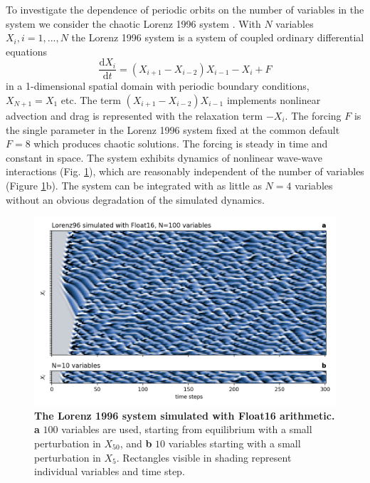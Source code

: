 To investigate the dependence of periodic orbits on the number of variables in the system we consider the chaotic Lorenz 1996 system
\citep{Hatfield2017, Lorenz1998}. With $N$ variables $X_i,i=1,...,N$ the Lorenz 1996 system is a system of coupled ordinary differential
equations
\begin{equation}
	\frac{\mathrm{d}X_i}{\mathrm{d}t} = (X_{i+1} - X_{i-2})X_{i-1} - X_i + F
	\label{eq:lorenz96}
\end{equation}
in a 1-dimensional spatial domain with periodic boundary conditions, $X_{N+1} = X_1$ etc. The term $(X_{i+1} - X_{i-2})X_{i-1}$
implements nonlinear advection and drag is represented with the relaxation term $-X_i$. The forcing $F$ is the single parameter
in the Lorenz 1996 system fixed at the common default $F=8$ which produces chaotic solutions. The forcing is steady in time and
constant in space. The system exhibits dynamics of nonlinear wave-wave interactions (Fig. \ref{fig:orbits_hovmoeller}), which are
reasonably independent of the number of variables (Figure \ref{fig:orbits_hovmoeller}b). The system can be integrated with as little
as $N=4$ variables without an obvious degradation of the simulated dynamics.

\begin{figure}[tbhp]
	\includegraphics[width=1\textwidth]{Figures/orbits/hovmoeller.png}
	\caption{\textbf{The Lorenz 1996 system simulated with Float16 arithmetic. a}
	$100$ variables are used, starting from equilibrium with a small perturbation in $X_{50}$, and
	\textbf{b} $10$ variables starting with a small perturbation in $X_5$. Rectangles visible in shading
	represent individual variables and time step.}
	\label{fig:orbits_hovmoeller}
\end{figure}

